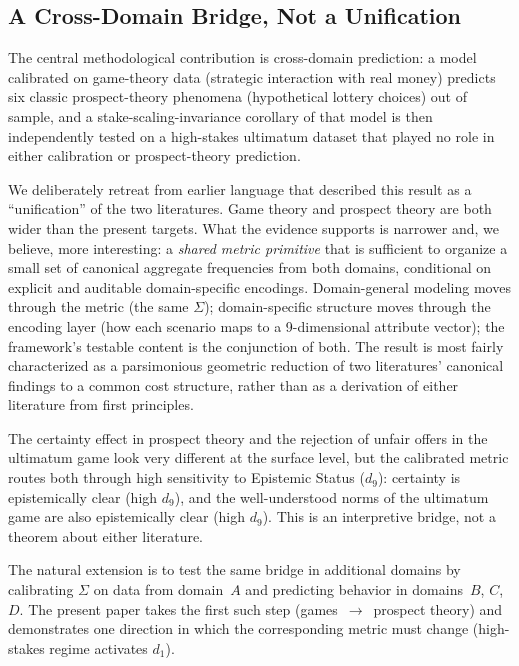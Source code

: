 \documentclass[journal]{IEEEtran}
\begin{document}
\subsection{A Cross-Domain Bridge, Not a Unification}

The central methodological contribution is cross-domain prediction: a model calibrated on game-theory data (strategic interaction with real money) predicts six classic prospect-theory phenomena (hypothetical lottery choices) out of sample, and a stake-scaling-invariance corollary of that model is then independently tested on a high-stakes ultimatum dataset that played no role in either calibration or prospect-theory prediction.

We deliberately retreat from earlier language that described this result as a ``unification'' of the two literatures.
Game theory and prospect theory are both wider than the present targets.
What the evidence supports is narrower and, we believe, more interesting: a \emph{shared metric primitive} that is sufficient to organize a small set of canonical aggregate frequencies from both domains, conditional on explicit and auditable domain-specific encodings.
Domain-general modeling moves through the metric (the same $\Sigma$); domain-specific structure moves through the encoding layer (how each scenario maps to a 9-dimensional attribute vector); the framework's testable content is the conjunction of both.
The result is most fairly characterized as a parsimonious geometric reduction of two literatures' canonical findings to a common cost structure, rather than as a derivation of either literature from first principles.

The certainty effect in prospect theory and the rejection of unfair offers in the ultimatum game look very different at the surface level, but the calibrated metric routes both through high sensitivity to Epistemic Status ($d_9$): certainty is epistemically clear (high $d_9$), and the well-understood norms of the ultimatum game are also epistemically clear (high $d_9$).
This is an interpretive bridge, not a theorem about either literature.

The natural extension is to test the same bridge in additional domains by calibrating $\Sigma$ on data from domain~$A$ and predicting behavior in domains~$B$, $C$, $D$.
The present paper takes the first such step (games~$\to$~prospect theory) and demonstrates one direction in which the corresponding metric must change (high-stakes regime activates $d_1$).
\end{document}

